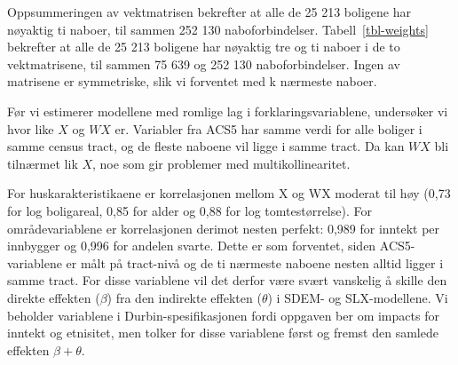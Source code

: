 \documentclass[
  norsk,
  a4paper,
]{article}
\begin{document}
Oppsummeringen av vektmatrisen bekrefter at alle de 25 213 boligene har
nøyaktig ti naboer, til sammen 252 130 naboforbindelser.
Tabell~\ref{tbl-weights} bekrefter at alle de 25 213 boligene har
nøyaktig tre og ti naboer i de to vektmatrisene, til sammen 75 639 og
252 130 naboforbindelser. Ingen av matrisene er symmetriske, slik vi
forventet med k nærmeste naboer.

Før vi estimerer modellene med romlige lag i forklaringsvariablene,
undersøker vi hvor like \(X\) og \(WX\) er. Variabler fra ACS5 har samme
verdi for alle boliger i samme census tract, og de fleste naboene vil
ligge i samme tract. Da kan \(WX\) bli tilnærmet lik \(X\), noe som gir
problemer med multikollinearitet.

\begin{table}

\caption{\label{tbl-wx-cor}Korrelasjon mellom X og WX (k = 10) for
variablene med romlige lag.}


\end{table}%

For huskarakteristikaene er korrelasjonen mellom X og WX moderat til høy
(0,73 for log boligareal, 0,85 for alder og 0,88 for log
tomtestørrelse). For områdevariablene er korrelasjonen derimot nesten
perfekt: 0,989 for inntekt per innbygger og 0,996 for andelen svarte.
Dette er som forventet, siden ACS5-variablene er målt på tract-nivå og
de ti nærmeste naboene nesten alltid ligger i samme tract. For disse
variablene vil det derfor være svært vanskelig å skille den direkte
effekten (\(\beta\)) fra den indirekte effekten (\(\theta\)) i SDEM- og
SLX-modellene. Vi beholder variablene i Durbin-spesifikasjonen fordi
oppgaven ber om impacts for inntekt og etnisitet, men tolker for disse
variablene først og fremst den samlede effekten \(\beta + \theta\).
\end{document}
